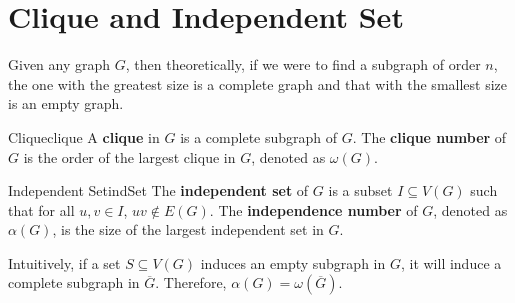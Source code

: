 \documentclass[math, code]{amznotes}
\theoremstyle{remark}
\begin{document}
\section{Clique and Independent Set}
Given any graph $G$, then theoretically, if we were to find a subgraph of order $n$, the one with the greatest size is a complete graph and that with the smallest size is an empty graph.
\begin{dfnbox}{Clique}{clique}
    A {\color{red} \textbf{clique}} in $G$ is a complete subgraph of $G$. The {\color{red} \textbf{clique number}} of $G$ is the order of the largest clique in $G$, denoted as $\omega(G)$.
\end{dfnbox}
\begin{dfnbox}{Independent Set}{indSet}
    The {\color{red} \textbf{independent set}} of $G$ is a subset $I \subseteq V(G)$ such that for all $u, v \in I$, $uv \notin E(G)$. The {\color{red} \textbf{independence number}} of $G$, denoted as $\alpha(G)$, is the size of the largest independent set in $G$.
\end{dfnbox}
Intuitively, if a set $S \subseteq V(G)$ induces an empty subgraph in $G$, it will induce a complete subgraph in $\overline{G}$. Therefore, $\alpha(G) = \omega(\overline{G})$.
\end{document}
